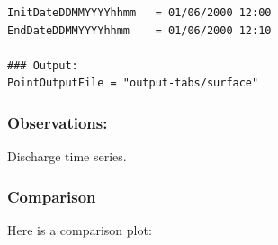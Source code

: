 \documentclass[
]{article}
\begin{document}
\begin{verbatim}
InitDateDDMMYYYYhhmm   = 01/06/2000 12:00
EndDateDDMMYYYYhhmm    = 01/06/2000 12:10

### Output:
PointOutputFile = "output-tabs/surface"
\end{verbatim}

\hypertarget{observations}{%
\subsubsection{Observations:}\label{observations}}

Discharge time series.

\hypertarget{comparison}{%
\subsubsection{Comparison}\label{comparison}}

Here is a comparison plot:
\end{document}
